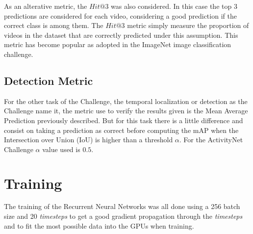 As an alterative metric, the $Hit@3$ was also considered. In this case the top 3 predictions are considered for each video, considering a good prediction if the correct class is among them. The $Hit@3$ metric simply measure the proportion of videos in the dataset that are correctly predicted under this assumption. This metric has become popular as adopted in the ImageNet image classification challenge.


\subsection{Detection Metric}

For the other task of the Challenge, the temporal localization or detection as the Challenge name it, the metric use to verify the results given is the Mean Average Prediction previously described. But for this task there is a little difference and consist on taking a prediction as correct before computing the mAP when the Intersection over Union (IoU) is higher than a threshold $\alpha$. For the ActivityNet Challenge $\alpha$ value used is $0.5$.




\section{Training}

The training of the Recurrent Neural Networks was all done using a 256 batch size and 20 \textit{timesteps} to get a good gradient propagation through the \textit{timesteps} and to fit the most possible data into the GPUs when training.

